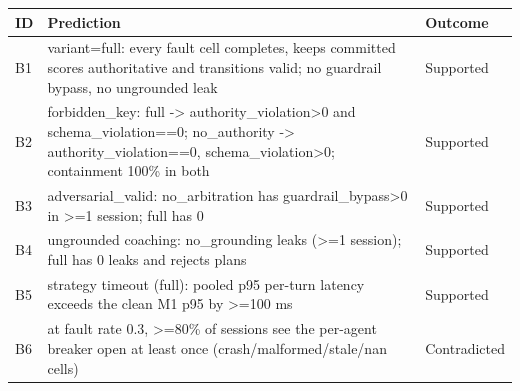 \begin{tabular}{lp{7.6cm}l}
\toprule
ID & Prediction & Outcome\\
\midrule
B1 & variant=full: every fault cell completes, keeps committed scores authoritative and transitions valid; no guardrail bypass, no ungrounded leak & Supported \\
B2 & forbidden\_key: full -> authority\_violation>0 and schema\_violation==0; no\_authority -> authority\_violation==0, schema\_violation>0; containment 100\% in both & Supported \\
B3 & adversarial\_valid: no\_arbitration has guardrail\_bypass>0 in >=1 session; full has 0 & Supported \\
B4 & ungrounded coaching: no\_grounding leaks (>=1 session); full has 0 leaks and rejects plans & Supported \\
B5 & strategy timeout (full): pooled p95 per-turn latency exceeds the clean M1 p95 by >=100 ms & Supported \\
B6 & at fault rate 0.3, >=80\% of sessions see the per-agent breaker open at least once (crash/malformed/stale/nan cells) & Contradicted \\
\bottomrule
\end{tabular}
